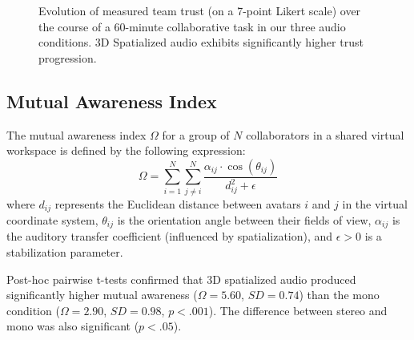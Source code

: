 \begin{figure}[t]
\centering
{}
\caption{Evolution of measured team trust (on a 7-point Likert scale) over the course of a 60-minute collaborative task in our three audio conditions. 3D Spatialized audio exhibits significantly higher trust progression.}
\label{fig:trust_over_time}
\end{figure}

\subsection{Mutual Awareness Index}
The mutual awareness index $\Omega$ for a group of $N$ collaborators in a shared virtual workspace is defined by the following expression:
\begin{equation}
\Omega = \sum_{i=1}^{N} \sum_{j \neq i}^{N} \frac{\alpha_{ij} \cdot \cos(\theta_{ij})}{d_{ij}^2 + \epsilon}
\label{eq:awareness}
\end{equation}
where $d_{ij}$ represents the Euclidean distance between avatars $i$ and $j$ in the virtual coordinate system, $\theta_{ij}$ is the orientation angle between their fields of view, $\alpha_{ij}$ is the auditory transfer coefficient (influenced by spatialization), and $\epsilon > 0$ is a stabilization parameter.

Post-hoc pairwise t-tests confirmed that 3D spatialized audio produced significantly higher mutual awareness ($\Omega = 5.60$, $SD = 0.74$) than the mono condition ($\Omega = 2.90$, $SD = 0.98$, $p < .001$). The difference between stereo and mono was also significant ($p < .05$).
